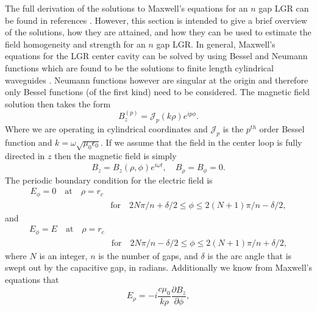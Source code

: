 The full derivation of the solutions to Maxwell's equations for an $n$ gap LGR can be found in references \cite{piasecki1993field, mehdizadeh1989Electromagnetic, mehdizadeh1983investigation}. However, this section is intended to give a brief overview of the solutions, how they are attained, and how they can be used to estimate the field homogeneity and strength for an $n$ gap LGR. In general, Maxwell's equations for the LGR center cavity can be solved by using Bessel and Neumann functions which are found to be the solutions to finite length cylindrical waveguides \cite{gardiol1985open}. Neumann functions however are singular at the origin and therefore only Bessel functions (of the first kind) need to be considered. The magnetic field solution then takes the form
\begin{equation} \label{solution1}
B_z^{(p)} = \mathcal{J}_p(k\rho) e^{i p \phi}.
\end{equation}
Where we are operating in cylindrical coordinates and $\mathcal{J}_p$ is the $p^{th}$ order Bessel function and $k = \omega \sqrt{\mu_0\epsilon_0}$. If we assume that the field in the center loop is fully directed in $z$ then the magnetic field is simply
\begin{equation}\label{boundary1}
B_z = B_z(\rho,\phi)e^{i\omega t}, \quad B_{\rho} = B_{\phi} = 0.
\end{equation} 
The periodic boundary condition for the electric field is
\begin{equation}\label{maxwell1}
\begin{split}
E_\phi = 0 \quad \text{at} \quad \rho = r_c \\
& \text{for} \quad 2N\pi/n + \delta/2 \leqslant \phi \leqslant 2(N+1)\pi/n-\delta/2,
\end{split}
\end{equation}
and
\begin{equation}\label{maxwell2}
\begin{split}
E_\phi = E \quad \text{at} \quad \rho = r_c \\
& \text{for} \quad 2N\pi/n - \delta/2 \leqslant \phi \leqslant 2(N+1)\pi/n+\delta/2,
\end{split}
\end{equation}
where $N$ is an integer, $n$ is the number of gaps, and $\delta$ is the arc angle that is swept out by the capacitive gap, in radians. Additionally we know from Maxwell's equations that
\begin{equation}\label{boundary2}
E_{\rho} = -i\frac{c \mu_0}{k \rho}\frac{\partial B_z}{\partial \phi},
\end{equation}
